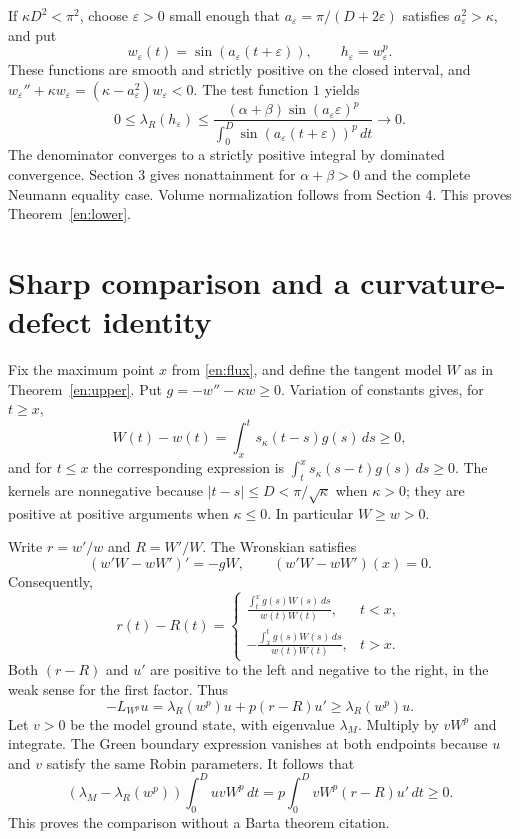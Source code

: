 \documentclass[12pt]{amsart}
\theoremstyle{definition}
\theoremstyle{remark}
\numberwithin{equation}{section}
\begin{document}
If $\kappa D^2<\pi^2$, choose $\varepsilon>0$ small enough that
$a_\varepsilon=\pi/(D+2\varepsilon)$ satisfies $a_\varepsilon^2>\kappa$, and put
\[
 w_\varepsilon(t)=\sin(a_\varepsilon(t+\varepsilon)),\qquad
 h_\varepsilon=w_\varepsilon^p.
\]
These functions are smooth and strictly positive on the closed interval, and
$w_\varepsilon''+\kappa w_\varepsilon=(\kappa-a_\varepsilon^2)w_\varepsilon<0$.
The test function $1$ yields
\[
 0\le\lambda_R(h_\varepsilon)\le
 \frac{(\alpha+\beta)\sin(a_\varepsilon\varepsilon)^p}
 {\int_0^D\sin(a_\varepsilon(t+\varepsilon))^p\,dt}\longrightarrow0.
\]
The denominator converges to a strictly positive integral by dominated convergence. Section 3 gives nonattainment for $\alpha+\beta>0$ and the complete Neumann equality case. Volume normalization follows from Section 4. This proves Theorem~\ref{en:lower}.

\section{Sharp comparison and a curvature-defect identity}
Fix the maximum point $x$ from \eqref{en:flux}, and define the tangent model $W$ as in Theorem~\ref{en:upper}. Put $g=-w''-\kappa w\ge0$. Variation of constants gives, for $t\ge x$,
\[
 W(t)-w(t)=\int_x^t s_\kappa(t-s)g(s)\,ds\ge0,
\]
and for $t\le x$ the corresponding expression is
$\int_t^x s_\kappa(s-t)g(s)\,ds\ge0$.
The kernels are nonnegative because $|t-s|\le D<\pi/\sqrt\kappa$ when $\kappa>0$; they are positive at positive arguments when $\kappa\le0$. In particular $W\ge w>0$.

Write $r=w'/w$ and $R=W'/W$. The Wronskian satisfies
\[
 (w'W-wW')'=-gW,\qquad (w'W-wW')(x)=0.
\]
Consequently,
\begin{equation}\label{en:drift}
 r(t)-R(t)=
 \begin{cases}
 \displaystyle\frac{\int_t^x g(s)W(s)\,ds}{w(t)W(t)},&t<x,\\[6pt]
 \displaystyle-\frac{\int_x^t g(s)W(s)\,ds}{w(t)W(t)},&t>x.
 \end{cases}
\end{equation}
Both $(r-R)$ and $u'$ are positive to the left and negative to the right, in the weak sense for the first factor. Thus
\[
 -L_{W^p}u=\lambda_R(w^p)u+p(r-R)u'\ge\lambda_R(w^p)u.
\]
Let $v>0$ be the model ground state, with eigenvalue $\lambda_M$. Multiply by $vW^p$ and integrate. The Green boundary expression vanishes at both endpoints because $u$ and $v$ satisfy the same Robin parameters. It follows that
\begin{equation}\label{en:gap}
 (\lambda_M-\lambda_R(w^p))\int_0^D uvW^p\,dt
 =p\int_0^D vW^p(r-R)u'\,dt\ge0.
\end{equation}
This proves the comparison without a Barta theorem citation.
\end{document}
